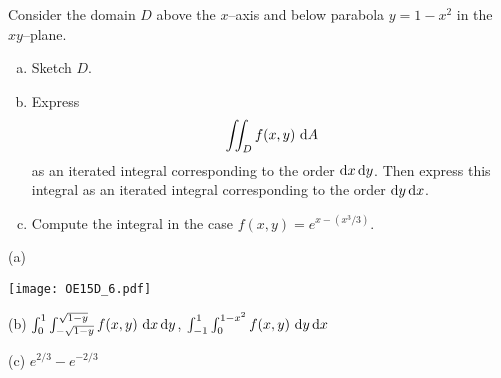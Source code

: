 \begin{question}[M200 2015D] %
Consider the domain $D$ above the $x$--axis and below parabola 
$y = 1-x^2$ in the $xy$--plane.
\begin{enumerate}[(a)]
\item
Sketch $D$.
\item
Express
\begin{equation*}
\dblInt_D f(x,y)\ \dee{A}
\end{equation*}
as an iterated integral corresponding to the order $\mathrm{d}x\,\mathrm{d}y$. 
Then express this integral as an iterated integral corresponding to 
the order $\mathrm{d}y\,\mathrm{d}x$.
\item
Compute the integral in the case $f(x,y) = e^{x-(x^3/3)}$.
\end{enumerate}
\end{question}

%

\begin{answer}
(a)

\begin{center}
\texttt{[image: OE15D\_6.pdf]}
\end{center}


(b) $\int_0^1 \int_{-\sqrt{1-y}}^{\sqrt{1-y}} f(x,y)\ \mathrm{d}x\,\mathrm{d}y$,
    $\int_{-1}^1 \int_0^{1-x^2} f(x,y)\ \dee{y}\,\dee{x}$

(c) $e^{2/3}-e^{-2/3}$
\end{answer}

